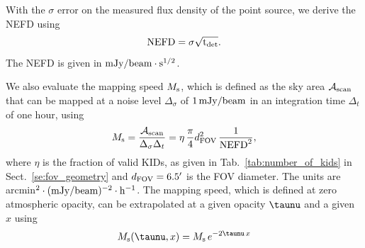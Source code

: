 
With the $\sigma$ error on the measured flux density of
the point source, we derive the NEFD using
\begin{equation}
  \rm{NEFD} = \sigma \sqrt{t_{\rm{det}}}. 
  \label{eq:nefd_det}
\end{equation}
The NEFD is given in $\rm{mJy}/{beam}\cdot s^{1/2}$.

We also evaluate the mapping speed $M_{\rm{s}}$, which is defined as the sky area
$\mathcal{A}_{\rm{scan}}$ that can be mapped at a noise level
$\Delta_\sigma$ of $1\,\rm{mJy}/{beam}$ in an integration time $\Delta_t$ of
one hour, using
%
\begin{equation}
M_{\rm{s}} = \frac{\mathcal{A}_{\rm{scan}}}{\Delta_\sigma\Delta_t} = \eta \, \frac{\pi}{4} d_{\rm{FOV}}^2 \, \frac{1}{\rm{NEFD}^2},
\label{eq:mapping_speed}
\end{equation}
%
where $\eta$ is the fraction of valid KIDs, as given in
Tab.~\ref{tab:number_of_kids} in Sect.~\ref{se:fov_geometry} and
$d_{\rm{FOV}} = 6.5'$ is the FOV diameter. The units are
arcmin$^2 \cdot (\rm{mJy}/{beam})^{-2} \cdot \rm{h}^{-1}$. 
The mapping speed, which is defined at zero atmospheric opacity, can be extrapolated at a given opacity $\taunu$
and a given \airmass\ $x$ using
\begin{equation}
  M_{\rm{s}}(\taunu, x) = M_{\rm{s}}\, e^{-2 \taunu \, x}
  \label{eq:ms_extrapol}
\end{equation}

